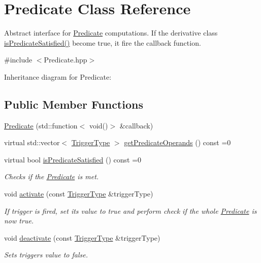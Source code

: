 \hypertarget{classPredicate}{}\section{Predicate Class Reference}
\label{classPredicate}


Abstract interface for \hyperlink{classPredicate}{Predicate} computations. If the derivative class\textquotesingle{} \hyperlink{classPredicate_a5734faf53a034e3521f6305c1b3c02d1}{is\+Predicate\+Satisfied()} become true, it fire the callback function.  




{\ttfamily \#include $<$Predicate.\+hpp$>$}



Inheritance diagram for Predicate\+:
\subsection*{Public Member Functions}
\begin{DoxyCompactItemize}
\item 
\hyperlink{classPredicate_ab6f0b27135d9f08f97bf79649e26f9c4}{Predicate} (std\+::function$<$ void()$>$ \&callback)
\item 
virtual std\+::vector$<$ \hyperlink{structTriggerType}{Trigger\+Type} $>$ \hyperlink{classPredicate_ae7e2eb0f72d66030168a0995fa9f05a0}{get\+Predicate\+Operands} () const =0
\item 
virtual bool \hyperlink{classPredicate_a5734faf53a034e3521f6305c1b3c02d1}{is\+Predicate\+Satisfied} () const =0\hypertarget{classPredicate_a5734faf53a034e3521f6305c1b3c02d1}{}\label{classPredicate_a5734faf53a034e3521f6305c1b3c02d1}

\begin{DoxyCompactList}\small\item\em Checks if the \hyperlink{classPredicate}{Predicate} is met. \end{DoxyCompactList}\item 
void \hyperlink{classPredicate_a8ff5d1b869af329aec0976512141ac45}{activate} (const \hyperlink{structTriggerType}{Trigger\+Type} \&trigger\+Type)\hypertarget{classPredicate_a8ff5d1b869af329aec0976512141ac45}{}\label{classPredicate_a8ff5d1b869af329aec0976512141ac45}

\begin{DoxyCompactList}\small\item\em If trigger is fired, set its value to true and perform check if the whole \hyperlink{classPredicate}{Predicate} is now true. \end{DoxyCompactList}\item 
void \hyperlink{classPredicate_a13fcab312663a3353bba777d497cf407}{deactivate} (const \hyperlink{structTriggerType}{Trigger\+Type} \&trigger\+Type)\hypertarget{classPredicate_a13fcab312663a3353bba777d497cf407}{}\label{classPredicate_a13fcab312663a3353bba777d497cf407}

\begin{DoxyCompactList}\small\item\em Sets trigger\textquotesingle{}s value to false. \end{DoxyCompactList}\end{DoxyCompactItemize}
